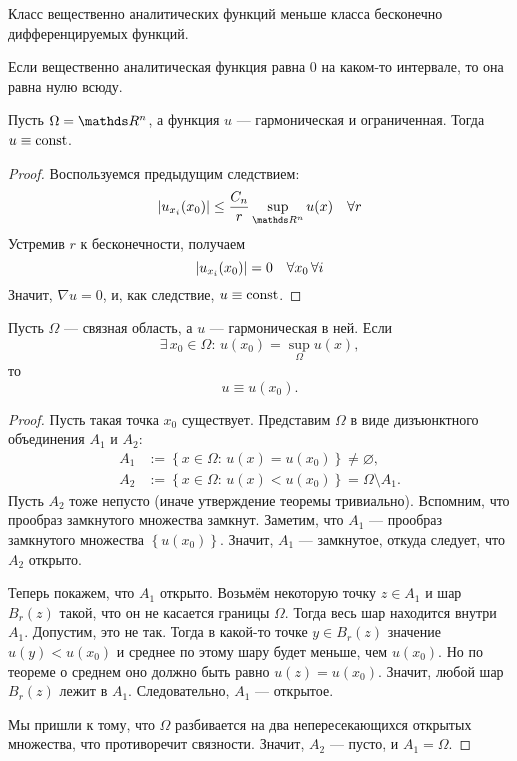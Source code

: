 \begin{note}
Класс вещественно аналитических функций меньше класса бесконечно дифференцируемых функций.
\end{note}

\begin{note}
Если вещественно аналитическая функция равна 0 на каком-то интервале, то она равна нулю всюду.
\end{note}

\begin{corollary}
Пусть $\Omega = \real^n$, а функция $u$ --- гармоническая и ограниченная. Тогда $u \equiv \operatorname{const}$.
\end{corollary}
\begin{proof}
Воспользуемся предыдущим следствием:
$$ \abs{u_{x_i} (x_0)} \leq \frac {C_n} {r} \sup_{\real^n} u(x) \quad \forall r$$
Устремив $r$ к бесконечности, получаем
$$ \lvert u_{x_i} (x_0)\rvert = 0 \quad \forall x_0 \, \forall i$$
Значит, $\nabla u = 0$, и, как следствие, $u \equiv \operatorname{const}$.

\end{proof}

\begin{theorem}
Пусть $\Omega$ --- связная область, а $u$ --- гармоническая в ней. Если
$$ \exists \, x_0 \in \Omega: \, u(x_0) = \sup_\Omega u(x),$$
 то $$u \equiv u(x_0).$$
\end{theorem}
\begin{proof}
Пусть такая точка $x_0$ существует. Представим $\Omega$ в виде дизъюнктного объединения $A_1$ и $A_2$:
\begin{align*}
	A_1 &:= \left\{ x \in \Omega: \, u(x) = u(x_0) \right\} \neq \varnothing, \\
	A_2 &:= \left\{ x \in \Omega: \, u(x) < u(x_0) \right\} = \Omega \setminus A_1.
\end{align*}
Пусть $A_2$ тоже непусто (иначе утверждение теоремы тривиально). Вспомним, что прообраз замкнутого множества замкнут. Заметим, что $A_1$ --- прообраз замкнутого множества $\left\{ u(x_0) \right\}$. Значит, $A_1$ --- замкнутое, откуда следует, что $A_2$ открыто.

Теперь покажем, что $A_1$ открыто. Возьмём некоторую точку $z \in A_1$ и шар $B_r (z)$ такой, что он не касается границы $\Omega$. Тогда весь шар находится внутри $A_1$. Допустим, это не так. Тогда в какой-то точке $y \in B_r (z) $ значение $u(y) < u(x_0)$ и среднее по этому шару будет меньше, чем $u(x_0)$. Но по теореме о среднем оно должно быть равно $u(z) = u(x_0)$. Значит, любой шар $B_r (z)$ лежит в $A_1$. Следовательно, $A_1$ --- открытое.

Мы пришли к тому, что $\Omega$ разбивается на два непересекающихся открытых множества, что противоречит связности. Значит, $A_2$ --- пусто, и $A_1 = \Omega$.

\end{proof}

